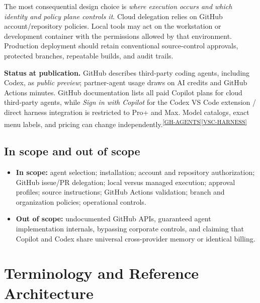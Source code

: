 \documentclass[11pt,letterpaper,oneside]{article}
\newcommand{\src}[1]{\textsuperscript{\hyperref[ref:#1]{[#1]}}}
\begin{document}
The most consequential design choice is \emph{where execution occurs and which identity and policy plane controls it}. Cloud delegation relies on GitHub account/repository policies. Local tools may act on the workstation or development container with the permissions allowed by that environment. Production deployment should retain conventional source-control approvals, protected branches, repeatable builds, and audit trails.

\begin{infobox}
\textbf{Status at publication.} GitHub describes third-party coding agents, including Codex, as \emph{public preview}; partner-agent usage draws on AI credits and GitHub Actions minutes. GitHub documentation lists all paid Copilot plans for cloud third-party agents, while \emph{Sign in with Copilot} for the Codex VS Code extension / direct harness integration is restricted to Pro+ and Max. Model catalogs, exact menu labels, and pricing can change independently.\src{GH-AGENTS}\src{VSC-HARNESS}
\end{infobox}

\subsection{In scope and out of scope}
\begin{itemize}
\item \textbf{In scope:} agent selection; installation; account and repository authorization; GitHub issue/PR delegation; local versus managed execution; approval profiles; source instructions; GitHub Actions validation; branch and organization policies; operational controls.
\item \textbf{Out of scope:} undocumented GitHub APIs, guaranteed agent implementation internals, bypassing corporate controls, and claiming that Copilot and Codex share universal cross-provider memory or identical billing.
\end{itemize}

\section{Terminology and Reference Architecture}
\end{document}
